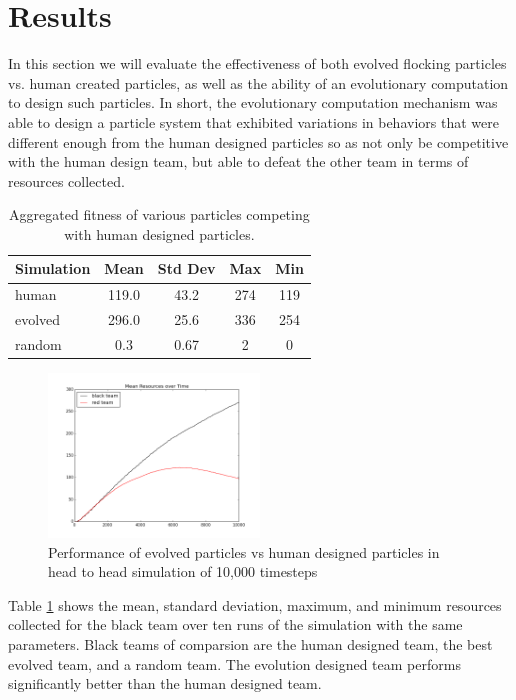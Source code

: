 \documentclass[12pt,journal,compsoc]{IEEEtran}
\begin{document}
\section{Results}

In this section we will evaluate the effectiveness of both evolved flocking particles vs. human created particles, as well as the ability of an evolutionary computation to design such particles. In short, the evolutionary computation mechanism was able to design a particle system that exhibited variations in behaviors that were different enough from the human designed particles so as not only be competitive with the human design team, but able to defeat the other team in terms of resources collected.

\begin{table}
    \renewcommand{\arraystretch}{1.5}
    \centering
    \begin{tabular}{l | c c cc}
        \hline
        Simulation & Mean & Std Dev & Max & Min \\
        \hline
        human & 119.0 & 43.2 & 274 & 119 \\
        evolved & 296.0 & 25.6 & 336 & 254 \\
        random & 0.3 & 0.67 & 2 & 0 \\
        \hline
    \end{tabular}
    \caption{Aggregated fitness of various particles competing with human designed particles.}
    \label{table:meanfitness}
\end{table}

\begin{figure}[ht!]
    \centering
        \includegraphics[width=0.5\textwidth]{figures/head2head}
    \caption{Performance of evolved particles vs human designed particles in head to head simulation of 10,000 timesteps}
    \label{fig:head2head}
\end{figure}

Table \ref{table:meanfitness} shows the mean, standard deviation, maximum, and minimum resources collected for the black team over ten runs of the simulation with the same parameters. Black teams of comparsion are the human designed team, the best evolved team, and a random team. The evolution designed team performs significantly better than the human designed team.
\end{document}

